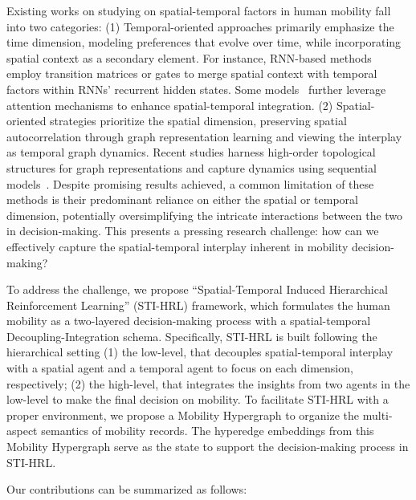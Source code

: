 \documentclass[letterpaper]{article} %
\begin{document}
%
Existing works on studying on spatial-temporal factors in human mobility fall into two categories:
(1) Temporal-oriented approaches primarily emphasize the time dimension, modeling preferences that evolve over time, while incorporating spatial context as a secondary element.
For instance, RNN-based methods~\cite{DBLP:conf/www/WangYCHWZH20,zhao2020go} employ transition matrices or gates to merge spatial context with temporal factors within RNNs' recurrent hidden states.
Some models~\cite{lian2020geography,DBLP:conf/www/LuoLL21} further leverage attention mechanisms to enhance spatial-temporal integration.
(2) Spatial-oriented strategies prioritize the spatial dimension, preserving spatial autocorrelation through graph representation learning and viewing the interplay as temporal graph dynamics.
Recent studies harness high-order topological structures for graph representations and capture dynamics using sequential models~\cite{wang2019adversarial,yang2019revisiting,wang2020exploiting,wang2022learning,wang2023reinforced}.
Despite promising results achieved, a common limitation of these methods is their predominant reliance on either the spatial or temporal dimension, potentially oversimplifying the intricate interactions between the two in decision-making.
This presents a pressing research challenge: how can we effectively capture the spatial-temporal interplay inherent in mobility decision-making?


To address the challenge, we propose ``Spatial-Temporal Induced Hierarchical Reinforcement Learning'' (STI-HRL) framework, which formulates the human mobility as a two-layered decision-making process with a spatial-temporal Decoupling-Integration schema.
Specifically, STI-HRL is built following the hierarchical setting
(1) the low-level, that decouples spatial-temporal interplay with a spatial agent and a temporal agent to focus on each dimension, respectively;
(2) the high-level, that integrates the insights from two agents in the low-level to make the final decision on mobility.
To facilitate STI-HRL with a proper environment, we propose a Mobility Hypergraph to organize the multi-aspect semantics of mobility records.
The hyperedge embeddings from this Mobility Hypergraph serve as the state to support the decision-making process in STI-HRL.

Our contributions can be summarized as follows:
\end{document}
